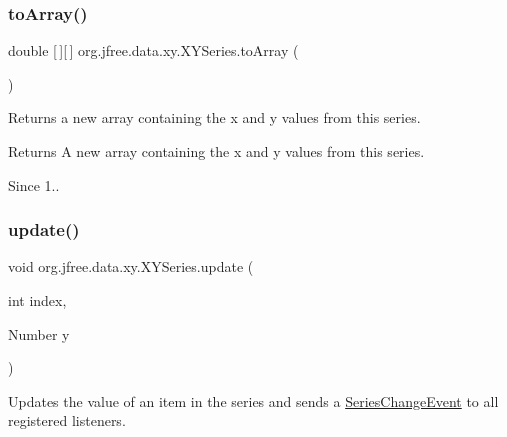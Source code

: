 \subsubsection{\texorpdfstring{to\+Array()}{toArray()}}
{\footnotesize\ttfamily double \mbox{[}$\,$\mbox{]}\mbox{[}$\,$\mbox{]} org.\+jfree.\+data.\+xy.\+X\+Y\+Series.\+to\+Array (\begin{DoxyParamCaption}{ }\end{DoxyParamCaption})}

Returns a new array containing the x and y values from this series.

\begin{DoxyReturn}{Returns}
A new array containing the x and y values from this series.
\end{DoxyReturn}
\begin{DoxySince}{Since}
1.. 
\end{DoxySince}
\mbox{\label{classorg_1_1jfree_1_1data_1_1xy_1_1_x_y_series_a85dbeaa30cf77cea90bd1e101f80cc3b}} 
\subsubsection{\texorpdfstring{update()}{update()}\hspace{0.1cm}{\footnotesize\ttfamily [1/2]}}
{\footnotesize\ttfamily void org.\+jfree.\+data.\+xy.\+X\+Y\+Series.\+update (\begin{DoxyParamCaption}\item[{int}]{index,  }\item[{Number}]{y }\end{DoxyParamCaption})}

Updates the value of an item in the series and sends a \mbox{\hyperlink{}{Series\+Change\+Event}} to all registered listeners.


